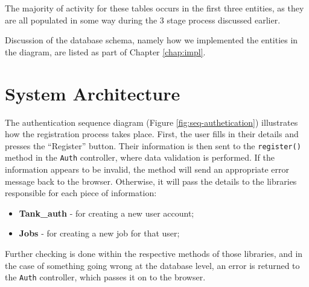 \documentclass{l3proj}
\begin{document}
The majority of activity for these tables occurs in the first three entities, as
they are all populated 
in some way during the 3 stage process discussed earlier.

Discussion of the database schema, namely how we implemented the entities in the
diagram, are listed as part of Chapter \ref{chap:impl}.

\newpage
\section{System Architecture}

The authentication sequence diagram (Figure \ref{fig:seq-authetication})
illustrates how the registration process takes place. First, the user fills in
their details and presses the ``Register'' button. Their information is then
sent to the \texttt{register()} method in the \texttt{Auth} controller,
where data validation is performed. If the information appears to be invalid,
the method will send an appropriate error message back to the browser. 
Otherwise, it will pass the details to the libraries responsible for each
piece of information:
\begin{itemize} \itemsep1pt \parskip0pt 
	\item \textbf{Tank\_auth} - for creating a new user account;
	\item \textbf{Jobs} - for creating a new job for that user;
\end{itemize}
Further checking is done within the respective methods of those libraries, and
in the case of something going wrong at the database level, an error is returned
to the \texttt{Auth} controller, which passes it on to the browser.
\end{document}
